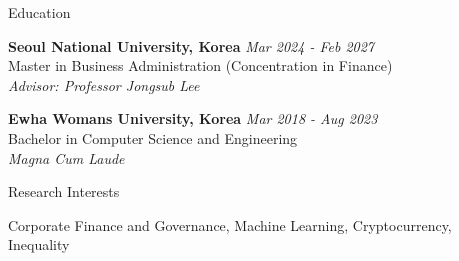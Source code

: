 \documentclass{resume} %
\begin{document}

\begin{rSection}{Education}

{\bf Seoul National University, Korea} \hfill {\em Mar 2024 - Feb 2027} 
\\{ Master in Business Administration (Concentration in Finance)} \hfill
\\ { \textit{Advisor: Professor Jongsub Lee}} 

{\bf Ewha Womans University, Korea} \hfill {\em Mar 2018 - Aug 2023} 
\\ {Bachelor in Computer Science and Engineering}
\\ { \textit{Magna Cum Laude}} 

\end{rSection}


\begin{rSection}{Research Interests}

    Corporate Finance and Governance, Machine Learning, Cryptocurrency, Inequality

\end{rSection}


\end{document}
